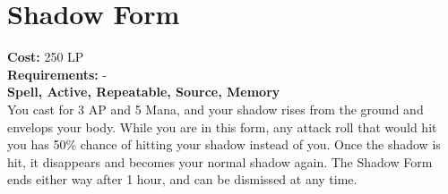 \section{Shadow Form}\label{spell:shadowForm}
\textbf{Cost:} 250 LP\\
\textbf{Requirements:} -\\
\textbf{Spell, Active, Repeatable, Source, Memory}\\
You cast for 3 AP and 5 Mana, and your shadow rises from the ground and envelops your body.
While you are in this form, any attack roll that would hit you has 50\% chance of hitting your shadow instead of you.
Once the shadow is hit, it disappears and becomes your normal shadow again.
The Shadow Form ends either way after 1 hour, and can be dismissed at any time.